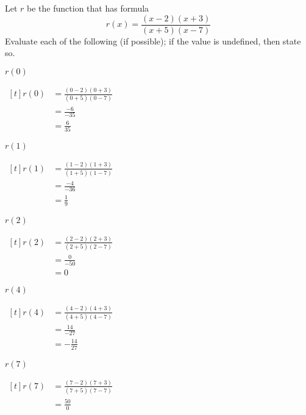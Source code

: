 \begin{exercises}
\begin{problem}
\begin{multicols}{3}
\end{multicols}
\end{problem}
\begin{problem}
Let $r$ be the function that has formula
\[
	r(x)=\frac{(x-2)(x+3)}{(x+5)(x-7)}
\]
Evaluate each of the following (if possible); if the value is undefined,
then state so.
\begin{multicols}{4}
	\begin{subproblem}
		$r(0)$
		\begin{shortsolution}
			$\begin{aligned}[t]
				r(0) & =\frac{(0-2)(0+3)}{(0+5)(0-7)} \\
				     & =\frac{-6}{-35}                \\
				     & =\frac{6}{35}
			\end{aligned}$
		\end{shortsolution}
	\end{subproblem}
	\begin{subproblem}
		$r(1)$
		\begin{shortsolution}
			$\begin{aligned}[t]
				r(1) & =\frac{(1-2)(1+3)}{(1+5)(1-7)} \\
				     & =\frac{-4}{-36}                \\
				     & =\frac{1}{9}
			\end{aligned}$
		\end{shortsolution}
	\end{subproblem}
	\begin{subproblem}
		$r(2)$
		\begin{shortsolution}
			$\begin{aligned}[t]
				r(2) & =\frac{(2-2)(2+3)}{(2+5)(2-7)} \\
				     & = \frac{0}{-50}                \\
				     & =0
			\end{aligned}$
		\end{shortsolution}
	\end{subproblem}
	\begin{subproblem}
		$r(4)$
		\begin{shortsolution}
			$\begin{aligned}[t]
				r(4) & =\frac{(4-2)(4+3)}{(4+5)(4-7)} \\
				     & =\frac{14}{-27}                \\
				     & =-\frac{14}{27}
			\end{aligned}$
		\end{shortsolution}
	\end{subproblem}
	\begin{subproblem}
		$r(7)$
		\begin{shortsolution}
			$\begin{aligned}[t]
				r(7) & =\frac{(7-2)(7+3)}{(7+5)(7-7)} \\
				     & =\frac{50}{0}
			\end{aligned}$


\end{shortsolution}
\end{subproblem}
\end{multicols}
\end{problem}
\end{exercises}
